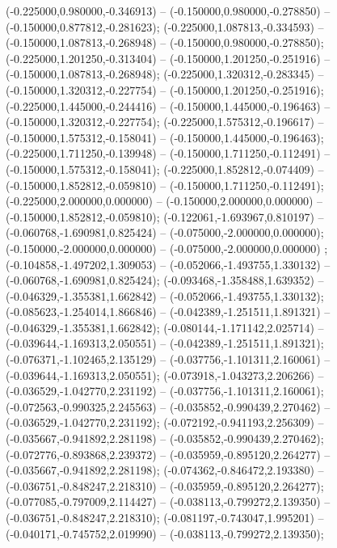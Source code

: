 (-0.225000,0.980000,-0.346913) -- (-0.150000,0.980000,-0.278850) -- (-0.150000,0.877812,-0.281623);
 (-0.225000,1.087813,-0.334593) -- (-0.150000,1.087813,-0.268948) -- (-0.150000,0.980000,-0.278850);
 (-0.225000,1.201250,-0.313404) -- (-0.150000,1.201250,-0.251916) -- (-0.150000,1.087813,-0.268948);
 (-0.225000,1.320312,-0.283345) -- (-0.150000,1.320312,-0.227754) -- (-0.150000,1.201250,-0.251916);
 (-0.225000,1.445000,-0.244416) -- (-0.150000,1.445000,-0.196463) -- (-0.150000,1.320312,-0.227754);
 (-0.225000,1.575312,-0.196617) -- (-0.150000,1.575312,-0.158041) -- (-0.150000,1.445000,-0.196463);
 (-0.225000,1.711250,-0.139948) -- (-0.150000,1.711250,-0.112491) -- (-0.150000,1.575312,-0.158041);
 (-0.225000,1.852812,-0.074409) -- (-0.150000,1.852812,-0.059810) -- (-0.150000,1.711250,-0.112491);
 (-0.225000,2.000000,0.000000) -- (-0.150000,2.000000,0.000000) -- (-0.150000,1.852812,-0.059810);
 (-0.122061,-1.693967,0.810197) -- (-0.060768,-1.690981,0.825424) -- (-0.075000,-2.000000,0.000000);
 (-0.150000,-2.000000,0.000000) -- (-0.075000,-2.000000,0.000000) ;
 (-0.104858,-1.497202,1.309053) -- (-0.052066,-1.493755,1.330132) -- (-0.060768,-1.690981,0.825424);
 (-0.093468,-1.358488,1.639352) -- (-0.046329,-1.355381,1.662842) -- (-0.052066,-1.493755,1.330132);
 (-0.085623,-1.254014,1.866846) -- (-0.042389,-1.251511,1.891321) -- (-0.046329,-1.355381,1.662842);
 (-0.080144,-1.171142,2.025714) -- (-0.039644,-1.169313,2.050551) -- (-0.042389,-1.251511,1.891321);
 (-0.076371,-1.102465,2.135129) -- (-0.037756,-1.101311,2.160061) -- (-0.039644,-1.169313,2.050551);
 (-0.073918,-1.043273,2.206266) -- (-0.036529,-1.042770,2.231192) -- (-0.037756,-1.101311,2.160061);
 (-0.072563,-0.990325,2.245563) -- (-0.035852,-0.990439,2.270462) -- (-0.036529,-1.042770,2.231192);
 (-0.072192,-0.941193,2.256309) -- (-0.035667,-0.941892,2.281198) -- (-0.035852,-0.990439,2.270462);
 (-0.072776,-0.893868,2.239372) -- (-0.035959,-0.895120,2.264277) -- (-0.035667,-0.941892,2.281198);
 (-0.074362,-0.846472,2.193380) -- (-0.036751,-0.848247,2.218310) -- (-0.035959,-0.895120,2.264277);
 (-0.077085,-0.797009,2.114427) -- (-0.038113,-0.799272,2.139350) -- (-0.036751,-0.848247,2.218310);
 (-0.081197,-0.743047,1.995201) -- (-0.040171,-0.745752,2.019990) -- (-0.038113,-0.799272,2.139350);
